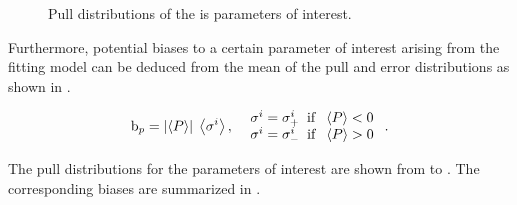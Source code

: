\begin{figure}[!t]
  \centering
  \begin{subfigure}{0.5\textwidth}
    \scalebox{0.57}{}
    \caption{}
    \label{pull_ACP0}
  \end{subfigure}%
  \hfill%
  \begin{subfigure}{0.5\textwidth}
    \scalebox{0.57}{}
    \caption{}
    \label{pull_ACPperp}
  \end{subfigure}
  \begin{subfigure}{0.5\textwidth}
    \scalebox{0.57}{}
    \caption{}
    \label{pull_ACPpar}
  \end{subfigure}%
  \hfill%
  \begin{subfigure}{0.5\textwidth}
    \scalebox{0.57}{}
    \caption{}
    \label{pull_ACPS}
  \end{subfigure}
\caption{Pull distributions of the \Acp{i} parameters of interest.}
\label{pull_acp}
\end{figure}

Furthermore, potential biases to a certain parameter of interest arising from the fitting model
can be deduced from the mean of the pull and error distributions as shown in .

\begin{equation}
{\rm b}_p = \left|\left<P\right>\right| \; \left<\sigma^i\right>,\;\; \left.
  \begin{array}{ll}
    \sigma^i = \sigma^i_+ \;\;{\rm if}\;\; \left<P\right> < 0 \\
    \sigma^i = \sigma^i_- \;\;{\rm if}\;\; \left<P\right> > 0
  \end{array} \right. .
\label{bias_def}
\end{equation}

The pull distributions for the parameters of interest are shown from  to .
The corresponding biases are summarized in .

